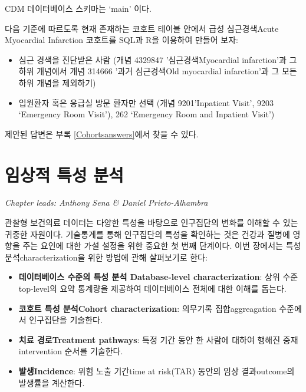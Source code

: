 \documentclass[10.5pt]{book}
\providecommand{\tightlist}{%
  \setlength{\itemsep}{0pt}\setlength{\parskip}{0pt}}
\theoremstyle{definition}
\theoremstyle{definition}
\theoremstyle{definition}
\theoremstyle{remark}
\let\BeginKnitrBlock\begin \let\EndKnitrBlock\end
\begin{document}
CDM 데이터베이스 스키마는 `main' 이다.

\BeginKnitrBlock{exercise}
\protect\hypertarget{exr:exerciseCohortsSql}{}{\label{exr:exerciseCohortsSql}
}다음 기준에 따르도록 현재 존재하는 코호트 테이블 안에서 급성
심근경색Acute Myocardial Infarction 코호트를 SQL과 R을 이용하여 만들어
보자:

\begin{itemize}
\tightlist
\item
  심근 경색을 진단받은 사람 (개념 4329847 '심근경색Myocardial
  infarction'과 그 하위 개념에서 개념 314666 '과거 심근경색Old
  myocardial infarction'과 그 모든 하위 개념을 제외하기)
\item
  입원환자 혹은 응급실 방문 환자만 선택 (개념 9201'Inpatient Visit',
  9203 `Emergency Room Visit'), 262 `Emergency Room and Inpatient
  Visit')
\end{itemize}
\EndKnitrBlock{exercise}

제안된 답변은 부록 \ref{Cohortsanswers}에서 찾을 수 있다.

\chapter{임상적 특성 분석}\label{Characterization}

\emph{Chapter leads: Anthony Sena \& Daniel Prieto-Alhambra}

관찰형 보건의료 데이터는 다양한 특성을 바탕으로 인구집단의 변화를 이해할
수 있는 귀중한 자원이다. 기술통계를 통해 인구집단의 특성을 확인하는 것은
건강과 질병에 영향을 주는 요인에 대한 가설 설정을 위한 중요한 첫 번째
단계이다. 이번 장에서는 특성 분석characterization을 위한 방법에 관해
살펴보기로 한다:

\begin{itemize}
\tightlist
\item
  \textbf{데이터베이스 수준의 특성 분석 Database-level
  characterization}: 상위 수준top-level의 요약 통계량을 제공하여
  데이터베이스 전체에 대한 이해를 돕는다.
\item
  \textbf{코호트 특성 분석Cohort characterization}: 의무기록
  집합aggreagation 수준에서 인구집단을 기술한다.
\item
  \textbf{치료 경로Treatment pathways}: 특정 기간 동안 한 사람에 대하여
  행해진 중재intervention 순서를 기술한다.
\item
  \textbf{발생Incidence}: 위험 노출 기간time at risk(TAR) 동안의 임상
  결과outcome의 발생률을 계산한다.
\end{itemize}
\end{document}
